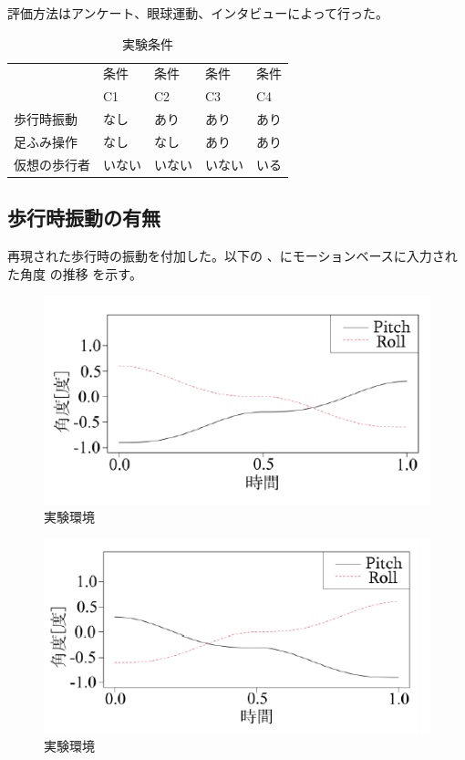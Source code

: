 \documentclass[uplatex]{jsarticle}   %
\begin{document}
評価方法はアンケート、眼球運動、インタビューによって行った。
\begin{table}
  \centering
  \caption{実験条件}
  \label{tab:fonts}
  \begin{tabular}[t]{|l|l|l|l|l|}
    \hline
     & 条件 & 条件 & 条件 & 条件\\
     & C1 & C2 & C3 &C4\\
    \hline
    歩行時振動 &なし&あり&あり&あり\\
    \hline
    足ふみ操作&なし&なし&あり&あり\\ 
    \hline
    仮想の歩行者&いない&いない&いない &いる\\
    \hline
  \end{tabular}
\end{table}
\subsection{歩行時振動の有無}
再現された歩行時の振動を付加した。以下の 、にモーションベースに入力された角度 の推移 を示す。


\begin{figure}[b]
    \centering
    \includegraphics{rinkou_figure_2.png}
    \caption{実験環境}
    \label{fig:my_label_2}
\end{figure}

\begin{figure}[b]
    \centering
    \includegraphics{rinkou_gigure_3.png}
    \caption{実験環境}
    \label{fig:my_label_3}
\end{figure}
\end{document}
